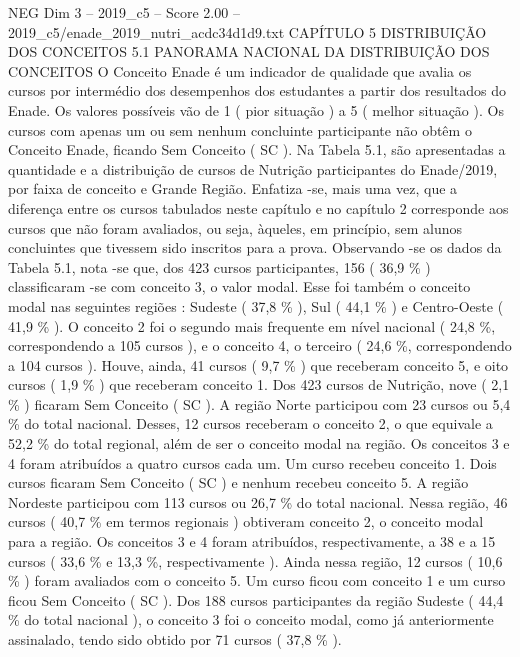 \begin{textsample}{NEG Dim 3 – 2019\_c5 – Score 2.00 – 2019\_c5/enade\_2019\_nutri\_acdc34d1d9.txt}  \label{ex:f3_neg_188}
CAPÍTULO 5 DISTRIBUIÇÃO DOS CONCEITOS 5.1 PANORAMA NACIONAL DA DISTRIBUIÇÃO DOS CONCEITOS O Conceito Enade é um indicador de qualidade que avalia os cursos por intermédio dos desempenhos dos estudantes a partir dos resultados do Enade.
Os valores possíveis vão de 1 ( pior situação ) a 5 ( melhor situação ).
Os cursos com apenas um ou sem nenhum concluinte participante não obtêm o Conceito Enade, ficando Sem Conceito ( SC ).
Na Tabela 5.1, são apresentadas a quantidade e a distribuição de cursos de Nutrição participantes do Enade/2019, por faixa de conceito e Grande Região.
Enfatiza -se, mais uma vez, que a diferença entre os cursos tabulados neste capítulo e no capítulo 2 corresponde aos cursos que não foram avaliados, ou seja, àqueles, em princípio, sem alunos concluintes que tivessem sido inscritos para a prova.
Observando -se os dados da Tabela 5.1, nota -se que, dos 423 cursos participantes, 156 ( 36,9 \% ) classificaram -se com conceito 3, o valor modal.
Esse foi também o conceito modal nas seguintes regiões : Sudeste ( 37,8 \% ), Sul ( 44,1 \% ) e Centro-Oeste ( 41,9 \% ).
O conceito 2 foi o segundo mais frequente em nível nacional ( 24,8 \%, correspondendo a 105 cursos ), e o conceito 4, o terceiro ( 24,6 \%, correspondendo a 104 cursos ).
Houve, ainda, 41 cursos ( 9,7 \% ) que receberam conceito 5, e oito cursos ( 1,9 \% ) que receberam conceito 1.
Dos 423 cursos de Nutrição, nove ( 2,1 \% ) ficaram Sem Conceito ( SC ).
A região Norte participou com 23 cursos ou 5,4 \% do total nacional.
Desses, 12 cursos receberam o conceito 2, o que equivale a 52,2 \% do total regional, além de ser o conceito modal na região.
Os conceitos 3 e 4 foram atribuídos a quatro cursos cada um.
Um curso recebeu conceito 1.
Dois cursos ficaram Sem Conceito ( SC ) e nenhum recebeu conceito 5.
A região Nordeste participou com 113 cursos ou 26,7 \% do total nacional.
Nessa região, 46 cursos ( 40,7 \% em termos regionais ) obtiveram conceito 2, o conceito modal para a região.
Os conceitos 3 e 4 foram atribuídos, respectivamente, a 38 e a 15 cursos ( 33,6 \% e 13,3 \%, respectivamente ).
Ainda nessa região, 12 cursos ( 10,6 \% ) foram avaliados com o conceito 5.
Um curso ficou com conceito 1 e um curso ficou Sem Conceito ( SC ).
Dos 188 cursos participantes da região Sudeste ( 44,4 \% do total nacional ), o conceito 3 foi o conceito modal, como já anteriormente assinalado, tendo sido obtido por 71 cursos ( 37,8 \% ).

\end{textsample}
